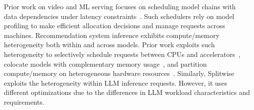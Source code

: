 {%
Prior work on video and ML serving focuses on scheduling model chains with data dependencies under latency constraints~\cite{hu2021scrooge,crankshaw2020inferline,romero2019_INFaaS,kannan2019_GrandSLAm,albahar2022schedtune}.
Such schedulers rely on model profiling to make efficient allocation decisions and manage requests across machines.
Recommendation system inference exhibits compute/memory heterogeneity both within and across models.
Prior work exploits such heterogeneity to selectively schedule requests between CPUs and accelerators~\cite{gupta2020deeprecsys,kwon2019tensordimm}, colocate models with complementary memory usage~\cite{choi2023hera}, and partition compute/memory on heterogeneous hardware resources~\cite{hwang2020centaur,jiang2021fleetrec}.
Similarly, Splitwise exploits the heterogeneity within LLM inference requests.
However, it uses different optimizations due to the differences in LLM workload characteristics and requirements.
}
